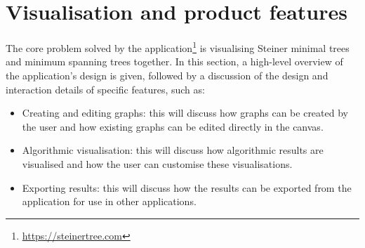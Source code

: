 \documentclass{l4proj}
\begin{document}
\chapter{Visualisation and product features}
The core problem solved by the application\footnote{\url{https://steinertree.com}} is visualising Steiner minimal trees and minimum spanning trees together.
In this section, a high-level overview of the application's design is given, followed by a discussion of the design and interaction details of specific features, such as:
\begin{itemize}
    \item Creating and editing graphs: this will discuss how graphs can be created by the user and how existing graphs can be edited directly in the canvas.
    \item Algorithmic visualisation: this will discuss how algorithmic results are visualised and how the user can customise these visualisations.
    \item Exporting results: this will discuss how the results can be exported from the application for use in other applications.
\end{itemize}
\end{document}

